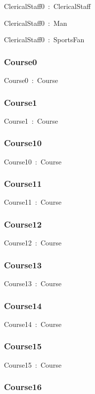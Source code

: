 \documentclass{article}
\begin{document}
ClericalStaff0~:~ClericalStaff

ClericalStaff0~:~Man

ClericalStaff0~:~SportsFan

\subsubsection*{Course0}

Course0~:~Course

\subsubsection*{Course1}

Course1~:~Course

\subsubsection*{Course10}

Course10~:~Course

\subsubsection*{Course11}

Course11~:~Course

\subsubsection*{Course12}

Course12~:~Course

\subsubsection*{Course13}

Course13~:~Course

\subsubsection*{Course14}

Course14~:~Course

\subsubsection*{Course15}

Course15~:~Course

\subsubsection*{Course16}
\end{document}
